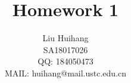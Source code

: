 \title{%
Homework 1
}

\author{\name Liu Huihang  \\
        \addr SA18017026 \\
        QQ: 184050473 \\ 
        MAIL: huihang@mail.ustc.edu.cn
       }

\editor{}

\maketitle